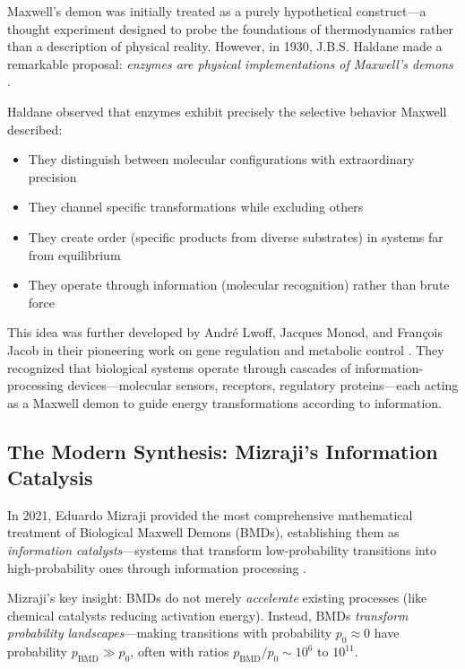 \documentclass[11pt]{article}
\theoremstyle{remark}
\begin{document}
Maxwell's demon was initially treated as a purely hypothetical construct—a thought experiment designed to probe the foundations of thermodynamics rather than a description of physical reality. However, in 1930, J.B.S. Haldane made a remarkable proposal: \textit{enzymes are physical implementations of Maxwell's demons} \cite{haldane1930enzymes}.

Haldane observed that enzymes exhibit precisely the selective behavior Maxwell described:
\begin{itemize}
\item They distinguish between molecular configurations with extraordinary precision
\item They channel specific transformations while excluding others
\item They create order (specific products from diverse substrates) in systems far from equilibrium
\item They operate through information (molecular recognition) rather than brute force
\end{itemize}

This idea was further developed by André Lwoff, Jacques Monod, and François Jacob in their pioneering work on gene regulation and metabolic control \cite{monod1971chance,jacob1970logic}. They recognized that biological systems operate through cascades of information-processing devices—molecular sensors, receptors, regulatory proteins—each acting as a Maxwell demon to guide energy transformations according to information.

\subsection{The Modern Synthesis: Mizraji's Information Catalysis}

In 2021, Eduardo Mizraji provided the most comprehensive mathematical treatment of Biological Maxwell Demons (BMDs), establishing them as \textit{information catalysts}—systems that transform low-probability transitions into high-probability ones through information processing \cite{mizraji2021biological}.

Mizraji's key insight: BMDs do not merely \textit{accelerate} existing processes (like chemical catalysts reducing activation energy). Instead, BMDs \textit{transform probability landscapes}—making transitions with probability $p_0 \approx 0$ have probability $p_{\text{BMD}} \gg p_0$, often with ratios $p_{\text{BMD}}/p_0 \sim 10^6$ to $10^{11}$.
\end{document}
